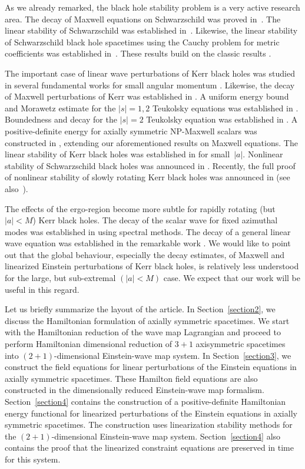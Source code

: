 \documentclass[pdftex]{sigma}
\numberwithin{equation}{section}
\begin{document}
As we already remarked, the black hole stability problem is a very active research area. The decay of Maxwell equations on Schwarzschild was proved in~\cite{PB_08}. The linear stability of Schwarzschild was established in~\cite{HDR_16}. Likewise, the linear stability of Schwarzschild black hole spacetimes using the Cauchy problem for metric coefficients was established in~\cite{HKW_16_2}. These results build on the classic results \cite{Moncrief_74, Regge-Wheeler_57,Zerilli_70,Zerilli_74}.


The important case of linear wave perturbations of Kerr black holes was studied in several fundamental works for small angular momentum \cite{LB_15_1,DR_11,Tato_11}. Likewise, the decay of Maxwell perturbations of Kerr was established in \cite{LB_15_2}. A uniform energy bound and Morawetz estimate for the $ \vert s \vert =1, 2$ Teukolsky equations was established in \cite{SMa_17_1,SMa_17_2}. Boundedness and decay for the $\vert s \vert=2$ Teukolsky equation was established in \cite{HDR_17}. A positive-definite energy for axially symmetric NP-Maxwell scalars was constructed in \cite{NG_19_1}, extending our aforementioned results on Maxwell equations.
The linear stability of Kerr black holes was established in \cite{ABBM_19,HHV_19} for small~$\vert a \vert$. Nonlinear stability of Schwarzschild black holes was announced in \cite{HDRT_21}. Recently, the full proof of nonlinear stability of slowly rotating Kerr black holes was announced in \cite{GKS_22} (see also~\mbox{\cite{GKS_20,KS_21}}).


The effects of the ergo-region become more subtle for rapidly rotating (but $\vert a \vert < M$) Kerr black holes. The decay of the scalar wave for fixed azimuthal modes was established in \cite{FKSY_06,FKSY_08_E,FKSY_08} using spectral methods. The decay of a general linear wave equation was established in the remarkable work \cite{DRS_16}. We would like to point out that the global behaviour, especially the decay estimates, of Maxwell and linearized Einstein perturbations of Kerr black holes, is relatively less understood for the large, but sub-extremal $(\vert a \vert < M)$ case. We expect that our work will be useful in this regard.

Let us briefly summarize the layout of the article. In Section~\ref{section2}, we discuss the Hamiltonian formulation of axially symmetric spacetimes. We start with the Hamiltonian reduction of the wave map Lagrangian and proceed to perform Hamiltonian dimensional reduction of $3+1$ axisymmetric spacetimes into $(2 + 1)$-dimensional Einstein-wave map system. In Section~\ref{section3}, we construct the field equations for linear perturbations of the Einstein equations in axially symmetric spacetimes. These Hamilton field equations are also constructed in the dimensionally reduced Einstein-wave map formalism. Section~\ref{section4} contains the construction of a positive-definite Hamiltonian energy functional for linearized perturbations of the Einstein equations in axially symmetric spacetimes. The construction uses linearization stability methods for the $(2 + 1)$-dimensional Einstein-wave map system. Section~\ref{section4} also contains the proof that the linearized constraint equations are preserved in time for this system.
\end{document}
